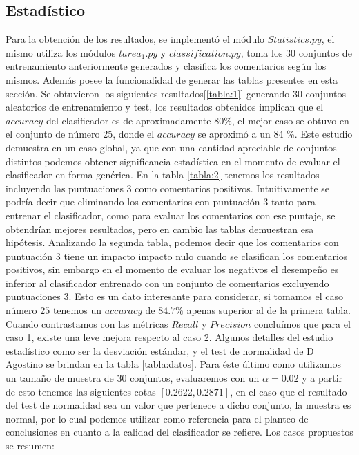 \documentclass[12pt]{article}
\begin{document}
\subsection{Estadístico} \label{sub:estad}
Para la obtención de los resultados, se implementó el módulo $Statistics.py$, el mismo utiliza los módulos $tarea_1.py$ y $classification.py$, toma los 30 conjuntos de entrenamiento anteriormente generados y clasifica los comentarios según los mismos. Además posee la funcionalidad de generar las tablas presentes en esta sección.
Se obtuvieron los siguientes resultados[\ref{tabla:1}] generando 30 conjuntos aleatorios de entrenamiento y test, los resultados obtenidos implican que el $accuracy$ del clasificador es de aproximadamente 80\%, el mejor caso se obtuvo en el conjunto de número 25, donde el $accuracy$ se aproximó a un 84 \%. Este estudio demuestra en un caso global, ya que con una cantidad apreciable de conjuntos distintos podemos obtener significancia estadística en el momento de evaluar el clasificador en forma genérica.
En la tabla \ref{tabla:2} tenemos los resultados incluyendo las puntuaciones 3 como comentarios positivos. Intuitivamente se podría decir que eliminando los comentarios con puntuación 3 tanto para entrenar el clasificador, como para evaluar los comentarios con ese puntaje, se obtendrían mejores resultados, pero en cambio las tablas demuestran esa hipótesis. Analizando la segunda tabla, podemos decir que los comentarios con puntuación 3 tiene un impacto impacto nulo cuando se clasifican los comentarios positivos, sin embargo en el momento de evaluar los negativos el desempeño es inferior al clasificador entrenado con un conjunto de comentarios excluyendo puntuaciones 3. Esto es un dato interesante para considerar, si tomamos el caso número $25$ tenemos un $accuracy$ de $84.7 \%$ apenas superior al de la primera tabla. Cuando contrastamos con las métricas $Recall$ y $Precision$ concluímos que para el caso 1, existe una leve mejora respecto al caso 2.
Algunos detalles del estudio estadístico como ser la desviación estándar, y el test de normalidad de D Agostino se brindan en la tabla \ref{tabla:datos}. Para éste último como utilizamos un tamaño de muestra de 30 conjuntos, evaluaremos con un $\alpha = 0.02$ y a partir de esto tenemos las siguientes cotas  $[0.2622 , 0.2871]$, en el caso que el resultado del test de normalidad sea un valor que pertenece a dicho conjunto, la muestra es normal, por lo cual podemos utilizar como referencia para el planteo de conclusiones en cuanto a la calidad del clasificador se refiere.
Los casos propuestos se resumen:
\end{document}
